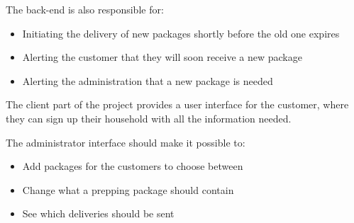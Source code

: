 \documentclass[a4paper,11pt]{article}
\begin{document}
The back-end is also responsible for:
\begin{itemize}
    \item Initiating the delivery of new packages shortly before the old one expires
    \item Alerting the customer that they will soon receive a new package
    \item Alerting the administration that a new package is needed
\end{itemize}

The client part of the project provides a user interface for the customer, where they can sign up their household with all the information needed.

The administrator interface should make it possible to:
\begin{itemize}
    \item Add packages for the customers to choose between
    \item Change what a prepping package should contain
    \item See which deliveries should be sent
\end{itemize}
\end{document}

